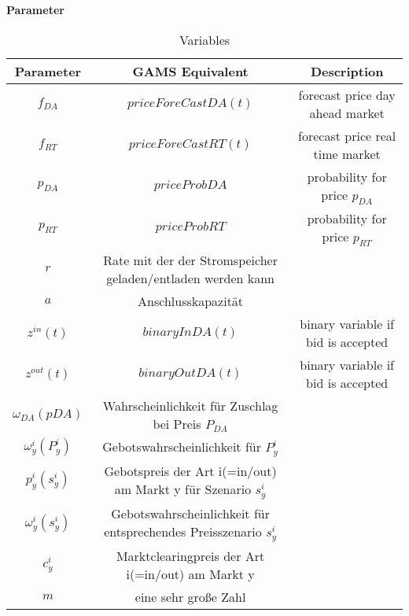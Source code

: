 \textbf{Parameter}
\begin{table}
	\centering
	\begin{tabular}{c|c|c}
		\textbf{Parameter}      & \textbf{GAMS} Equivalent                                          & Description                        \\
		\hline
		$f_{DA}$                & $priceForeCastDA(t)$                                              & forecast price day ahead market    \\
		$f_{RT}$                & $priceForeCastRT(t)$                                              & forecast price real time market    \\

		$p_{DA}$                & $ priceProbDA $                                                   & probability for price $p_{DA}$     \\
		$p_{RT}$                & $ priceProbRT $                                                   & probability for price $p_{RT}$     \\


		$r$                     & Rate mit der der Stromspeicher geladen/entladen werden kann                                            \\
		$a$                     & Anschlusskapazität                                                                                     \\
		$z^{in}(t)$             & $binaryInDA(t)$                                                   & binary variable if bid is accepted \\
		$z^{out}(t)$            & $binaryOutDA(t)$                                                  & binary variable if bid is accepted \\
		$\omega_{DA}(pDA) $     & Wahrscheinlichkeit für Zuschlag bei Preis $P_{DA}$                                                     \\
		$\omega^i_{y}(P^i_{y})$ & Gebotswahrscheinlichkeit für $P^i_{y}$                                                                 \\
		$p^i_{y}(s^i_y)$        & Gebotspreis der Art i(=in/out) am Markt y für Szenario $s^i_y$                                         \\
		$\omega^i_{y}(s^i_y)$   & Gebotswahrscheinlichkeit für entsprechendes Preisszenario $s^i_y$                                      \\
		$c^i_y$                 & Marktclearingpreis der Art i(=in/out) am Markt y                                                       \\
		$m$                     & eine sehr große Zahl                                                                                   \\
	\end{tabular}
	\caption{Variables}
	\label{tab:my_label}
\end{table}





